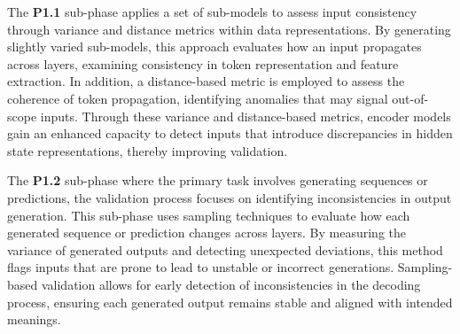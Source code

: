  The \textbf{P1.1} sub-phase applies a set of sub-models to assess input consistency through variance and distance metrics within data representations. By generating slightly varied sub-models, this approach evaluates how an input propagates across layers, examining consistency in token representation and feature extraction. In addition, a distance-based metric is employed to assess the coherence of token propagation, identifying anomalies that may signal out-of-scope inputs. Through these variance and distance-based metrics, encoder models gain an enhanced capacity to detect inputs that introduce discrepancies in hidden state representations, thereby improving validation.
 

 The \textbf{P1.2} sub-phase where the primary task involves generating sequences or predictions, the validation process focuses on identifying inconsistencies in output generation. This sub-phase uses sampling techniques to evaluate how each generated sequence or prediction changes across layers. By measuring the variance of generated outputs and detecting unexpected deviations, this method flags inputs that are prone to lead to unstable or incorrect generations. Sampling-based validation allows for early detection of inconsistencies in the decoding process, ensuring each generated output remains stable and aligned with intended meanings.


